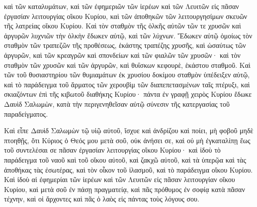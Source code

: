 {καὶ τῶν καταλυμάτων, καὶ τῶν ἐφημεριῶν τῶν ἱερέων καὶ τῶν Λευιτῶν εἰς πᾶσαν ἐργασίαν λειτουργίας οἴκου Κυρίου, καὶ τῶν ἀποθηκῶν τῶν λειτουργησίμων σκευῶν τῆς λατρείας οἴκου Κυρίου.
Καὶ τὸν σταθμὸν τῆς ὁλκῆς αὐτῶν τῶν τε χρυσῶν καὶ ἀργυρῶν λυχνιῶν τὴν ὁλκὴν ἔδωκεν αὐτῷ,
καὶ τῶν λύχνων.
Ἔδωκεν αὐτῷ ὁμοίως τὸν σταθμὸν τῶν τραπεζῶν τῆς προθέσεως, ἑκάστης τραπέζης χρυσῆς, καὶ ὡσαύτως τῶν ἀργυρῶν,
καὶ τῶν κρεαγρῶν καὶ σπονδείων καὶ τῶν φιαλῶν τῶν χρυσῶν· καὶ τὸν σταθμὸν τῶν χρυσῶν καὶ τῶν ἀργυρῶν, καὶ θυΐσκων κεφουρὲ, ἑκάστου σταθμοῦ.
Καὶ τῶν τοῦ θυσιαστηρίου τῶν θυμιαμάτων ἐκ χρυσίου δοκίμου σταθμὸν ὑπέδειξεν αὐτῷ, καὶ τὸ παράδειγμα τοῦ ἅρματος τῶν χερουβὶμ τῶν διαπεπετασμένων ταῖς πτέρυξι, καὶ σκιαζόντων ἐπὶ τῆς κιβωτοῦ διαθήκης Κυρίου·
πάντα ἐν γραφῇ χειρὸς Κυρίου ἔδωκε Δαυὶδ Σαλωμὼν, κατὰ τὴν περιγενηθεῖσαν αὐτῷ σύνεσιν τῆς κατεργασίας τοῦ παραδείγματος.
\par }{\PP {}Καὶ εἶπε Δαυὶδ Σαλωμὼν τῷ υἱῷ αὐτοῦ, ἴσχυε καὶ ἀνδρίζου καὶ ποίει, μὴ φοβοῦ μηδὲ πτοηθῇς, ὅτι Κύριος ὁ Θεός μου μετὰ σοῦ, οὐκ ἀνήσει σε, καὶ οὐ μὴ ἐγκαταλίπῃ ἕως τοῦ συντελέσαι σε πᾶσαν ἐργασίαν λειτουργίας οἴκου Κυρίου· καὶ ἰδοὺ τὸ παράδειγμα τοῦ ναοῦ καὶ τοῦ οἴκου αὐτοῦ, καὶ ζακχῶ αὐτοῦ, καὶ τὰ ὑπερῷα καὶ τὰς ἀποθήκας τὰς ἐσωτέρας, καὶ τὸν οἶκον τοῦ ἱλασμοῦ, καὶ τὸ παράδειγμα οἴκου Κυρίου.
Καὶ ἰδοὺ αἱ ἐφημερίαι τῶν ἱερέων καὶ τῶν Λευιτῶν εἰς πᾶσαν λειτουργίαν οἴκου Κυρίου, καὶ μετὰ σοῦ ἐν πάσῃ πραγματείᾳ, καὶ πᾶς πρόθυμος ἐν σοφίᾳ κατὰ πᾶσαν τέχνην, καὶ οἱ ἄρχοντες καὶ πᾶς ὁ λαὸς εἰς πάντας τοὺς λόγους σου.

}

